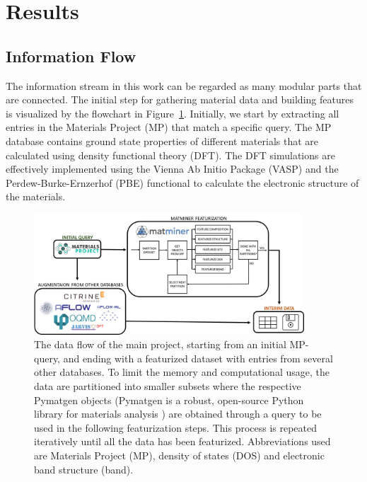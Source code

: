 \documentclass[superscriptaddress,unsortedaddress,
 amsmath,amssymb,
 aps,
]{revtex4-2}
\begin{document}
\section*{Results}

\subsection*{Information Flow} 

The information stream in this work can be regarded as many modular parts 
that are connected. 
The initial step for gathering material data and building features is visualized by the  flowchart in Figure~\ref{fig:flowchart}. 
Initially, we start by extracting all entries in the Materials Project (MP) that match a specific query. 
The MP database contains ground state properties of different materials that are calculated using density functional theory (DFT). The DFT simulations are effectively implemented using the Vienna Ab Initio Package (VASP) \cite{Kresse1996} and the  Perdew-Burke-Ernzerhof (PBE) \cite{Perdew1996}  functional to calculate the electronic structure of the materials. 

\begin{figure}[t]
    \centering
    \includegraphics[width=0.9\textwidth]{figures/flow_chart.png}
    \caption{The data flow of the main project, starting from an initial MP-query, and ending with a featurized dataset with entries from several other databases. To limit the memory and computational usage, the data are
    partitioned into smaller subsets where the respective Pymatgen objects (Pymatgen is a robust, open-source Python library for materials analysis \cite{pymatgen}) are obtained through a query to be used in
    the following featurization steps. This process is repeated iteratively until all the data has been featurized.
    Abbreviations used are Materials Project (MP), density of states (DOS) and electronic band structure (band).
    }
    \label{fig:flowchart}
\end{figure}
\end{document}
